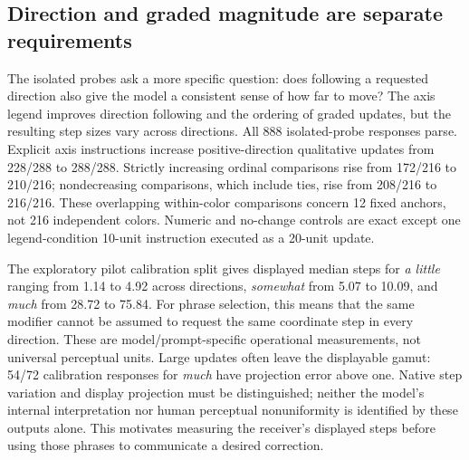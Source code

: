 \documentclass[11pt]{article}
\begin{document}
\subsection{Direction and graded magnitude are separate requirements}
\label{sec:results_quantifiers}
The isolated probes ask a more specific question: does following a
requested direction also give the model a consistent sense of how far to
move? The axis legend improves direction following and the ordering of
graded updates, but the resulting step sizes vary across directions.
All 888 isolated-probe responses parse. Explicit axis instructions increase
positive-direction qualitative updates from 228/288 to 288/288.
Strictly increasing ordinal comparisons rise from 172/216 to 210/216;
nondecreasing comparisons, which include ties, rise from 208/216 to 216/216.
These overlapping within-color comparisons concern 12 fixed anchors, not
216 independent colors. Numeric and no-change controls are exact except
one legend-condition 10-unit instruction executed as a 20-unit update.

The exploratory pilot calibration split gives displayed median steps for
\emph{a little} ranging from 1.14 to 4.92 across directions,
\emph{somewhat} from 5.07 to 10.09, and \emph{much} from 28.72 to 75.84.
For phrase selection, this means that the same modifier cannot be assumed
to request the same coordinate step in every direction.
These are model/prompt-specific operational measurements, not universal
perceptual units. Large updates often leave the displayable gamut:
54/72 calibration responses for \emph{much} have projection error above one.
Native step variation and display projection must be distinguished; neither
the model's internal interpretation nor human perceptual nonuniformity is
identified by these outputs alone.
This motivates measuring the receiver's displayed steps before using
those phrases to communicate a desired correction.
\end{document}
